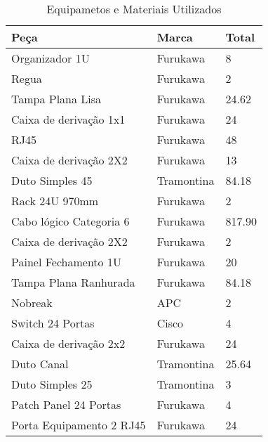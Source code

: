 \begin{table}[]
	\centering
	\caption{Equipametos e Materiais Utilizados}
	\label{equip}
	\begin{tabular}{|l|l|l|}
		\hline
		\textbf{Peça}            & \textbf{Marca} & \textbf{Total} \\ \hline
		Organizador 1U           & Furukawa       & 8              \\ \hline
		Regua                    & Furukawa       & 2              \\ \hline
		Tampa Plana Lisa         & Furukawa       & 24.62          \\ \hline
		Caixa de derivação 1x1   & Furukawa       & 24             \\ \hline
		RJ45                     & Furukawa       & 48             \\ \hline
		Caixa de derivação 2X2   & Furukawa       & 13             \\ \hline
		Duto Simples 45          & Tramontina     & 84.18          \\ \hline
		Rack 24U 970mm           & Furukawa       & 2              \\ \hline
		Cabo lógico Categoria 6  & Furukawa       & 817.90         \\ \hline
		Caixa de derivação 2X2   & Furukawa       & 2              \\ \hline
		Painel Fechamento 1U     & Furukawa       & 20             \\ \hline
		Tampa Plana Ranhurada    & Furukawa       & 84.18          \\ \hline
		Nobreak                  & APC            & 2              \\ \hline
		Switch 24 Portas         & Cisco          & 4              \\ \hline
		Caixa de derivação 2x2   & Furukawa       & 24             \\ \hline
		Duto Canal               & Tramontina     & 25.64          \\ \hline
		Duto Simples 25          & Tramontina     & 3              \\ \hline
		Patch Panel 24 Portas    & Furukawa       & 4              \\ \hline
		Porta Equipamento 2 RJ45 & Furukawa       & 24             \\ \hline
	\end{tabular}
\end{table}